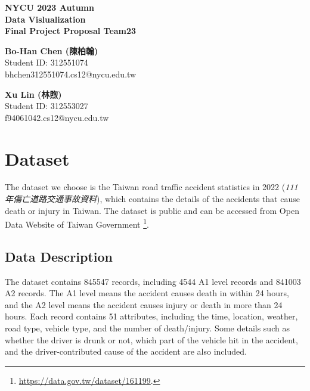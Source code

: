 \documentclass[a4paper, oneside, final, 12pt]{scrartcl} %
\begin{document}


\begin{center}
    {\fontsize{18}{30}\textbf{NYCU 2023 Autumn \\ Data Vislualization \\ Final Project Proposal Team23}} \\
\end{center}

  \begin{minipage}[t]{0.45\textwidth}
    \begin{center}
      \textbf{Bo-Han Chen (陳柏翰)} \\
      Student ID: 312551074 \\
      bhchen312551074.cs12@nycu.edu.tw
    \end{center}
  \end{minipage}
  \begin{minipage}[t]{0.45\textwidth}
    \begin{center}
      \textbf{Xu Lin (林煦)} \\
      Student ID: 312553027 \\
      f94061042.cs12@nycu.edu.tw
    \end{center}
  \end{minipage}

\section{Dataset}

\begingroup
\raggedright

The dataset we choose is the Taiwan road traffic accident statistics 
in 2022 (\emph{111年傷亡道路交通事故資料}), which contains the details of
the accidents that cause death or injury in Taiwan.
The dataset is public and can be accessed from Open Data Website of Taiwan Government
\footnote{\url{https://data.gov.tw/dataset/161199}.}.

\subsection{Data Description}

The dataset contains 845547 records, 
including 4544 A1 level records and 841003 A2 records.
The A1 level means the accident causes death in within 24 hours,
and the A2 level means the accident causes injury or death in more than 24 hours.
Each record contains 51 attributes, including the time, location,
weather, road type, vehicle type, and the number of death/injury.
Some details such as whether the driver is drunk or not, 
which part of the vehicle hit in the accident, 
and the driver-contributed cause of the accident are also included.
\end{document}
